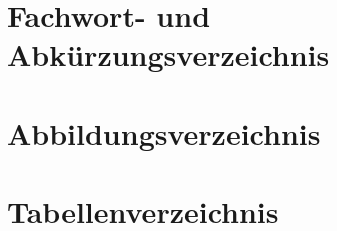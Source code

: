 \documentclass[12pt,a4paper,oneside,bibliography=totocnumbered]{scrartcl}
\author{\MyAuthor}
\title{\MyTitel}
\date{\MyDatum}
\let\abk\nomenclature
\begin{document}

\newpage
 
\renewcommand{\thesection}{\Roman{section}}  %

\thispagestyle{empty}


\newpage
\tableofcontents
\clearpage

\setcounter{section}{0}
\renewcommand{\thesection}{\arabic{section}} %








\newpage
 \section{Fachwort- und Abkürzungsverzeichnis}
\printnomenclature
\newpage

\section{Abbildungsverzeichnis}
\renewcommand{\listfigurename}{} 
\listoffigures
\newpage

\section{Tabellenverzeichnis}
\renewcommand{\listtablename}{} 
\listoftables
\newpage

\renewcommand\refname{Literatur- und Quellenverzeichnis}
\nocite{*}


\newpage

\thispagestyle{empty}


\lfoot{\LaTeX}
\end{document}
